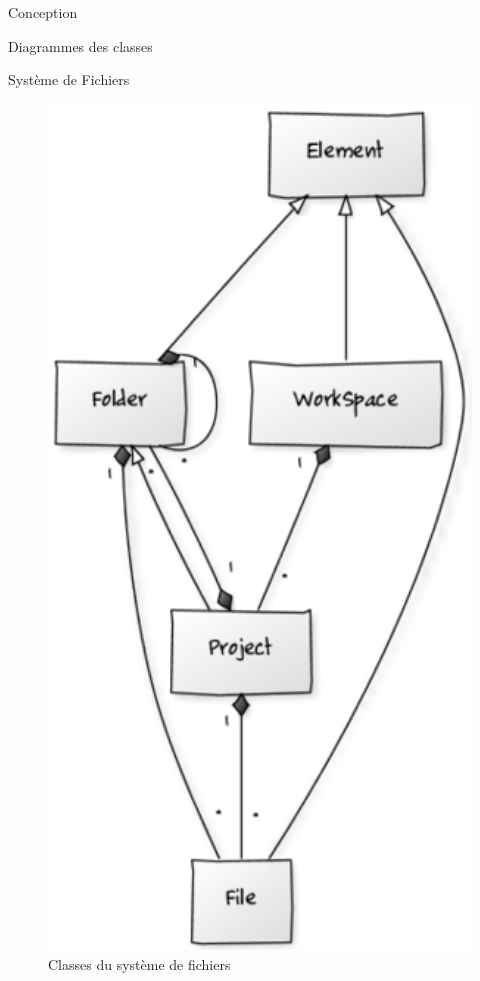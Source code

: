 \documentclass[a4paper, 12pt]{report}
\begin{document}
\begin{part}{Conception}
\begin{chapter}{Diagrammes des classes}
\begin{section}{Système de Fichiers}
\begin{figure}[ht]
\begin{center}
						\includegraphics[width=14cm]{images/diagrammeArborescence.png}
						\caption{Classes du système de fichiers}
						\label{arbo}
					\end{center}
				\end{figure}~\\

\end{section}
\end{chapter}
\end{part}
\end{document}
